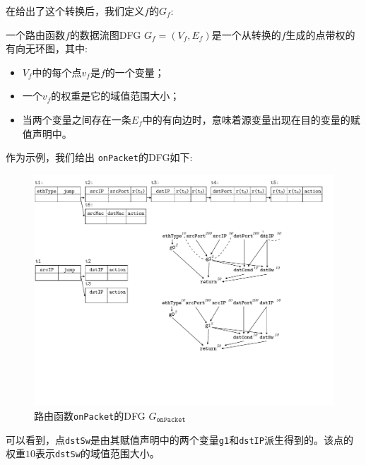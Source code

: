 在给出了这个转换后，我们定义$f$的$G_f$:

\begin{definition} 一个路由函数$f$的数据流图DFG $G_f = (V_f, E_f)$是一个从转换的$f$生成的点带权的有向无环图，其中:
\begin{itemize}
  \item $V_f$中的每个点$v_f$是$f$的一个变量；
  \item 一个$v_f$的权重是它的域值范围大小；
  \item 当两个变量之间存在一条$E_f$中的有向边时，意味着源变量出现在目的变量的赋值声明中。
\end{itemize}
\end{definition}

作为示例，我们给出 \texttt{onPacket}的DFG如下:
\begin{figure}[tbh]
    \centering
    \includegraphics[scale = 0.8]{figures/figure2.pdf}
    \caption{路由函数\texttt{onPacket}的DFG $G_{\texttt{onPacket}}$}
    \label{cap:fig:onpkt-dfg}
\end{figure}

可以看到，点\texttt{dstSw}是由其赋值声明中的两个变量\texttt{g1}和\texttt{dstIP}派生得到的。该点的权重$10$表示\texttt{dstSw}的域值范围大小。





